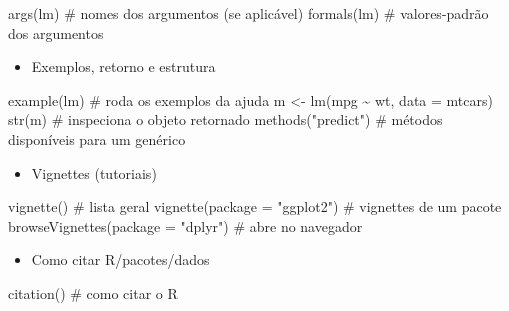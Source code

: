 \documentclass[
  letterpaper,
  DIV=11,
  numbers=noendperiod]{scrreprt}
\newenvironment{Shaded}{\begin{snugshade}}{\end{snugshade}}
\newcommand{\AttributeTok}[1]{\textcolor[rgb]{0.40,0.45,0.13}{#1}}
\newcommand{\CommentTok}[1]{\textcolor[rgb]{0.37,0.37,0.37}{#1}}
\newcommand{\FunctionTok}[1]{\textcolor[rgb]{0.28,0.35,0.67}{#1}}
\newcommand{\NormalTok}[1]{\textcolor[rgb]{0.00,0.23,0.31}{#1}}
\newcommand{\OtherTok}[1]{\textcolor[rgb]{0.00,0.23,0.31}{#1}}
\newcommand{\SpecialCharTok}[1]{\textcolor[rgb]{0.37,0.37,0.37}{#1}}
\newcommand{\StringTok}[1]{\textcolor[rgb]{0.13,0.47,0.30}{#1}}
\providecommand{\tightlist}{%
  \setlength{\itemsep}{0pt}\setlength{\parskip}{0pt}}\usepackage{longtable,booktabs,array}
\begin{document}
\begin{Shaded}
\begin{Highlighting}[]
\FunctionTok{args}\NormalTok{(lm)  }\CommentTok{\# nomes dos argumentos (se aplicável)}
\FunctionTok{formals}\NormalTok{(lm) }\CommentTok{\# valores{-}padrão dos argumentos}
\end{Highlighting}
\end{Shaded}

\begin{itemize}
\tightlist
\item
  Exemplos, retorno e estrutura
\end{itemize}

\begin{Shaded}
\begin{Highlighting}[]
\FunctionTok{example}\NormalTok{(lm) }\CommentTok{\# roda os exemplos da ajuda}
\NormalTok{m }\OtherTok{\textless{}{-}} \FunctionTok{lm}\NormalTok{(mpg }\SpecialCharTok{\textasciitilde{}}\NormalTok{ wt, }\AttributeTok{data =}\NormalTok{ mtcars)}
\FunctionTok{str}\NormalTok{(m)                  }\CommentTok{\# inspeciona o objeto retornado}
\FunctionTok{methods}\NormalTok{(}\StringTok{"predict"}\NormalTok{)      }\CommentTok{\# métodos disponíveis para um genérico}
\end{Highlighting}
\end{Shaded}

\begin{itemize}
\tightlist
\item
  Vignettes (tutoriais)
\end{itemize}

\begin{Shaded}
\begin{Highlighting}[]
\FunctionTok{vignette}\NormalTok{()  }\CommentTok{\# lista geral}
\FunctionTok{vignette}\NormalTok{(}\AttributeTok{package =} \StringTok{"ggplot2"}\NormalTok{) }\CommentTok{\# vignettes de um pacote}
\FunctionTok{browseVignettes}\NormalTok{(}\AttributeTok{package =} \StringTok{"dplyr"}\NormalTok{)  }\CommentTok{\# abre no navegador}
\end{Highlighting}
\end{Shaded}

\begin{itemize}
\tightlist
\item
  Como citar R/pacotes/dados
\end{itemize}

\begin{Shaded}
\begin{Highlighting}[]
\FunctionTok{citation}\NormalTok{()  }\CommentTok{\# como citar o R}
\end{Highlighting}
\end{Shaded}
\end{document}
